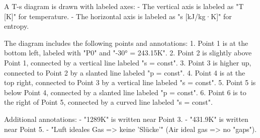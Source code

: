A T-s diagram is drawn with labeled axes:  
- The vertical axis is labeled as "T [K]" for temperature.  
- The horizontal axis is labeled as "s [kJ/kg·K]" for entropy.  

The diagram includes the following points and annotations:  
1. Point 1 is at the bottom left, labeled with "P0" and "-30° = 243.15K".  
2. Point 2 is slightly above Point 1, connected by a vertical line labeled "s = const".  
3. Point 3 is higher up, connected to Point 2 by a slanted line labeled "p = const".  
4. Point 4 is at the top right, connected to Point 3 by a vertical line labeled "s = const".  
5. Point 5 is below Point 4, connected by a slanted line labeled "p = const".  
6. Point 6 is to the right of Point 5, connected by a curved line labeled "s = const".  

Additional annotations:  
- "1289K" is written near Point 3.  
- "431.9K" is written near Point 5.  
- "Luft ideales Gas => keine 'Slücke'" (Air ideal gas => no "gaps").
